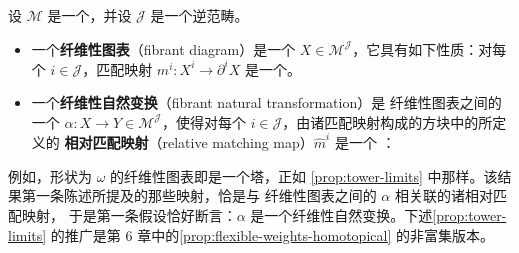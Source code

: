 \begin{definition}\label{def:fibrant-diagram}
设 $\mathcal{M}$ 是一个\trCategoryOfFibrantObjects，并设 $\mathcal{J}$ 是一个逆范畴。
\begin{itemize}
\item 一个\textbf{纤维性图表}（fibrant diagram）是一个\trDiagram
  $X\in\mathcal{M}^{\mathcal{J}}$，它具有如下性质：对每个
  $i\in\mathcal{J}$，匹配映射 $m^i\colon X^i\to\partial^i X$
  是一个\trFibration。
\item 一个\textbf{纤维性自然变换}（fibrant natural transformation）是
  纤维性图表之间的一个\trNaturalTransformation{}
  $\alpha\colon X\to Y\in\mathcal{M}^{\mathcal{J}}$，使得对每个
  $i\in\mathcal{J}$，由诸匹配映射构成的方块中的\trPullback{}所定义的
  \textbf{相对匹配映射}（relative matching map）$\hat{m}^i$ 是一个%
  \trFibration：
\begin{rveq}\label{eq:relative-matching-map}
\end{rveq}
\end{itemize}
\end{definition}

例如，形状为 $\omega$ 的纤维性图表即是一个\trFibration{}塔，正如%
\cref{prop:tower-limits} 中那样。该结果第一条陈述所提及的那些映射，恰是与
纤维性图表之间的\trNaturalTransformation{} $\alpha$ 相关联的诸相对匹配映射，
于是第一条假设恰好断言：$\alpha$ 是一个纤维性自然变换。下述\cref{prop:tower-limits}
的推广是第 6 章中的\cref{prop:flexible-weights-homotopical} 的非富集版本。

